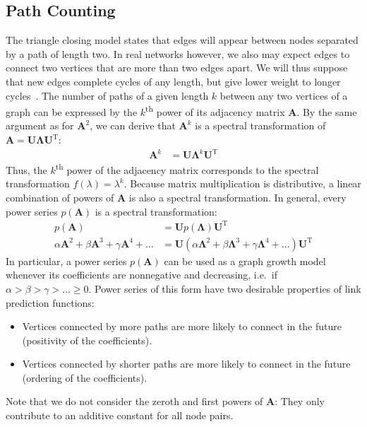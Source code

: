 \documentclass[11pt,a4paper]{book}
\begin{document}
\subsection{Path Counting}
\label{sec:path-counting}
The triangle closing model states that edges will appear between
nodes separated by a path of length two.  
In real networks however, we also may
expect edges
to connect two vertices that are more than two edges apart. 
We will thus suppose that new edges complete cycles
of any length, but give lower weight to longer cycles~\cite{b594}. 
The number of paths of a given length $k$ between any two
vertices of a graph can be expressed by the $k$\textsuperscript{th}
power of its adjacency 
matrix $\mathbf A$.  By the same argument as for $\mathbf A^2$,
we can derive that $\mathbf A^k$ is a spectral transformation of
$\mathbf A = \mathbf U \mathbf \Lambda \mathbf U^{\mathrm T}$:
\begin{align*}
  \mathbf A^k &= \mathbf U \mathbf \Lambda^k \mathbf U^{\mathrm T} 
\end{align*}
Thus, the $k$\textsuperscript{th} power of the adjacency matrix
corresponds to the spectral transformation $f(\lambda)=\lambda^k$.
Because matrix multiplication is distributive, a linear combination of
powers of $\mathbf A$ is also a spectral transformation.  In general,
every power series $p(\mathbf A)$ is a spectral transformation:
\begin{align}
  p(\mathbf A) &= \mathbf U p(\mathbf \Lambda) \mathbf U^{\mathrm
    T} \label{eq:path-counting} \\ 
  \alpha \mathbf A^2 + \beta \mathbf A^3 + \gamma \mathbf A^4 + \ldots &=
  \mathbf U (\alpha \mathbf \Lambda^2 + \beta \mathbf \Lambda^3 + \gamma
  \mathbf \Lambda^4 + \ldots  ) \mathbf U^{\mathrm T} \nonumber 
\end{align}
In particular, a power series $p(\mathbf A)$ can be used as a graph growth
model whenever its coefficients are nonnegative and decreasing,
i.e.\ if $\alpha > \beta > \gamma > \ldots \geq 0$.  Power series of this
form have two desirable properties of link prediction functions:
\begin{itemize}
\item Vertices connected by more paths are more likely to connect in the
  future (positivity of the coefficients). 
\item Vertices connected by shorter paths are more likely to connect in
  the future (ordering of the coefficients). 
\end{itemize}
Note that we do not consider the zeroth and first powers of $\mathbf A$:
They only contribute to an additive constant for all node pairs.
\end{document}
